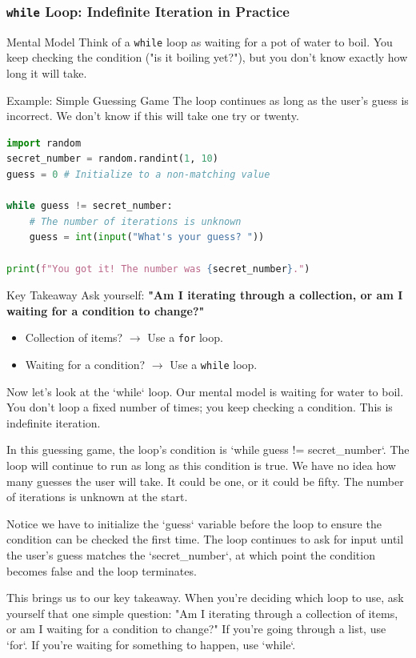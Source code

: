 \documentclass{beamer}
\begin{document}
\begin{frame}[fragile]
    \frametitle{\texttt{while} Loop: Indefinite Iteration in Practice}
    
    \begin{block}{Mental Model}
        Think of a \texttt{while} loop as waiting for a pot of water to boil. You keep checking the condition ("is it boiling yet?"), but you don't know exactly how long it will take.
    \end{block}
    
    \begin{exampleblock}{Example: Simple Guessing Game}
        The loop continues as long as the user's guess is incorrect. We don't know if this will take one try or twenty.
        \begin{lstlisting}[language=Python]
% Code Snippet
import random
secret_number = random.randint(1, 10)
guess = 0 # Initialize to a non-matching value

while guess != secret_number:
    # The number of iterations is unknown
    guess = int(input("What's your guess? "))

print(f"You got it! The number was {secret_number}.")
        \end{lstlisting}
    \end{exampleblock}
    
    \begin{alertblock}{Key Takeaway}
        Ask yourself: \textbf{"Am I iterating through a collection, or am I waiting for a condition to change?"}
        \begin{itemize}
            \item Collection of items? $\rightarrow$ Use a \texttt{for} loop.
            \item Waiting for a condition? $\rightarrow$ Use a \texttt{while} loop.
        \end{itemize}
    \end{alertblock}

    \begin{note}
    Now let's look at the `while` loop. Our mental model is waiting for water to boil. You don't loop a fixed number of times; you keep checking a condition. This is indefinite iteration.

    In this guessing game, the loop's condition is `while guess != secret_number`. The loop will continue to run as long as this condition is true. We have no idea how many guesses the user will take. It could be one, or it could be fifty. The number of iterations is unknown at the start.

    Notice we have to initialize the `guess` variable before the loop to ensure the condition can be checked the first time. The loop continues to ask for input until the user's guess matches the `secret_number`, at which point the condition becomes false and the loop terminates.

    This brings us to our key takeaway. When you're deciding which loop to use, ask yourself that one simple question: "Am I iterating through a collection of items, or am I waiting for a condition to change?" If you're going through a list, use `for`. If you're waiting for something to happen, use `while`.
    \end{note}
\end{frame}
\end{document}
